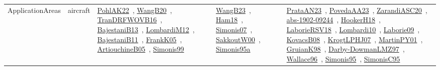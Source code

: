 {\begin{longtable}{lp{3cm}>{\raggedright\arraybackslash}p{6cm}>{\raggedright\arraybackslash}p{6cm}>{\raggedright\arraybackslash}p{8cm}}
ApplicationAreas & aircraft & \href{works/PohlAK22.pdf}{PohlAK22}~\cite{PohlAK22}, \href{works/WangB20.pdf}{WangB20}~\cite{WangB20}, \href{works/TranDRFWOVB16.pdf}{TranDRFWOVB16}~\cite{TranDRFWOVB16}, \href{works/BajestaniB13.pdf}{BajestaniB13}~\cite{BajestaniB13}, \href{works/LombardiM12.pdf}{LombardiM12}~\cite{LombardiM12}, \href{works/BajestaniB11.pdf}{BajestaniB11}~\cite{BajestaniB11}, \href{works/FrankK05.pdf}{FrankK05}~\cite{FrankK05}, \href{works/ArtiouchineB05.pdf}{ArtiouchineB05}~\cite{ArtiouchineB05}, \href{works/Simonis99.pdf}{Simonis99}~\cite{Simonis99} & \href{works/WangB23.pdf}{WangB23}~\cite{WangB23}, \href{works/Ham18.pdf}{Ham18}~\cite{Ham18}, \href{works/Simonis07.pdf}{Simonis07}~\cite{Simonis07}, \href{works/SakkoutW00.pdf}{SakkoutW00}~\cite{SakkoutW00}, \href{works/Simonis95a.pdf}{Simonis95a}~\cite{Simonis95a} & \href{works/PrataAN23.pdf}{PrataAN23}~\cite{PrataAN23}, \href{works/PovedaAA23.pdf}{PovedaAA23}~\cite{PovedaAA23}, \href{works/ZarandiASC20.pdf}{ZarandiASC20}~\cite{ZarandiASC20}, \href{works/abs-1902-09244.pdf}{abs-1902-09244}~\cite{abs-1902-09244}, \href{works/HookerH18.pdf}{HookerH18}~\cite{HookerH18}, \href{works/LaborieRSV18.pdf}{LaborieRSV18}~\cite{LaborieRSV18}, \href{works/Lombardi10.pdf}{Lombardi10}~\cite{Lombardi10}, \href{works/Laborie09.pdf}{Laborie09}~\cite{Laborie09}, \href{works/KovacsB08.pdf}{KovacsB08}~\cite{KovacsB08}, \href{works/KrogtLPHJ07.pdf}{KrogtLPHJ07}~\cite{KrogtLPHJ07}, \href{works/MartinPY01.pdf}{MartinPY01}~\cite{MartinPY01}, \href{works/GruianK98.pdf}{GruianK98}~\cite{GruianK98}, \href{works/Darby-DowmanLMZ97.pdf}{Darby-DowmanLMZ97}~\cite{Darby-DowmanLMZ97}, \href{works/Wallace96.pdf}{Wallace96}~\cite{Wallace96}, \href{works/Simonis95.pdf}{Simonis95}~\cite{Simonis95}, \href{works/SimonisC95.pdf}{SimonisC95}~\cite{SimonisC95}\\

\end{longtable}}

